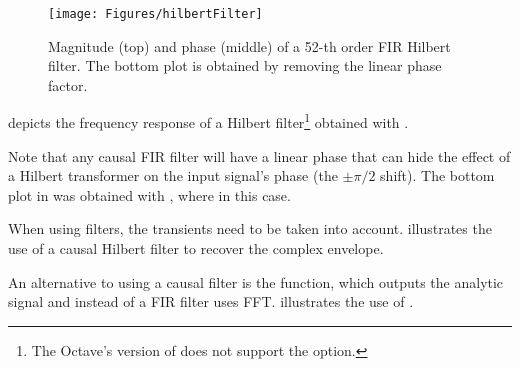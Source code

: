 \begin{figure}[htbp]
\centering
\texttt{[image: Figures/hilbertFilter]}
\caption{Magnitude (top) and phase (middle) of a 52-th order FIR Hilbert filter. The bottom plot is obtained by removing the linear phase factor.\label{fig:hilbertFilter}}
\end{figure}

 depicts the frequency response of a Hilbert filter\footnote{The Octave's version of  does not support the  option.}  obtained with .

Note that any causal FIR filter will have a linear phase that can hide the effect of a Hilbert transformer on the input signal's phase (the $\pm \pi/2$ shift). The bottom plot in  was obtained with , where  in this case.

When using filters, the transients need to be taken into account.  illustrates the use of a causal Hilbert filter to recover the complex envelope.



An alternative to using a causal filter is the  function, which outputs the analytic signal and instead of a FIR filter uses FFT.  illustrates the use of .



